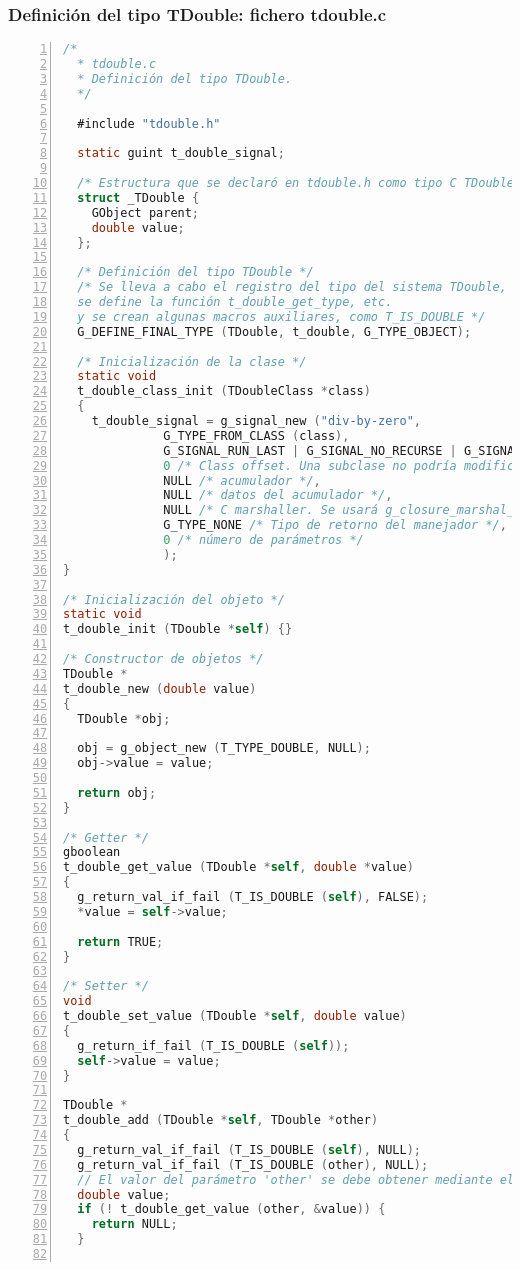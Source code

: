 \subsubsection{Definición del tipo \textsf{TDouble}: fichero \textsf{tdouble.c}}
\begin{lstlisting}[language=C, numbers=left]
  /*
  * tdouble.c
  * Definición del tipo TDouble.
  */

  #include "tdouble.h"

  static guint t_double_signal;

  /* Estructura que se declaró en tdouble.h como tipo C TDouble */
  struct _TDouble {
    GObject parent;
    double value;
  };

  /* Definición del tipo TDouble */
  /* Se lleva a cabo el registro del tipo del sistema TDouble,
  se define la función t_double_get_type, etc.
  y se crean algunas macros auxiliares, como T_IS_DOUBLE */
  G_DEFINE_FINAL_TYPE (TDouble, t_double, G_TYPE_OBJECT);

  /* Inicialización de la clase */
  static void
  t_double_class_init (TDoubleClass *class)
  {
    t_double_signal = g_signal_new ("div-by-zero",
			  G_TYPE_FROM_CLASS (class),
			  G_SIGNAL_RUN_LAST | G_SIGNAL_NO_RECURSE | G_SIGNAL_NO_HOOKS,
			  0 /* Class offset. Una subclase no podría modificar el manejador de señal (manejador por defecto) */,
			  NULL /* acumulador */,
			  NULL /* datos del acumulador */,
			  NULL /* C marshaller. Se usará g_closure_marshal_generic() */,
			  G_TYPE_NONE /* Tipo de retorno del manejador */,
			  0 /* número de parámetros */
			  );
}

/* Inicialización del objeto */
static void
t_double_init (TDouble *self) {}

/* Constructor de objetos */
TDouble *
t_double_new (double value)
{
  TDouble *obj;
  
  obj = g_object_new (T_TYPE_DOUBLE, NULL);
  obj->value = value;
  
  return obj;
}

/* Getter */
gboolean
t_double_get_value (TDouble *self, double *value)
{
  g_return_val_if_fail (T_IS_DOUBLE (self), FALSE);
  *value = self->value;
  
  return TRUE;
}

/* Setter */
void
t_double_set_value (TDouble *self, double value)
{
  g_return_if_fail (T_IS_DOUBLE (self));
  self->value = value;
}

TDouble *
t_double_add (TDouble *self, TDouble *other)
{
  g_return_val_if_fail (T_IS_DOUBLE (self), NULL);
  g_return_val_if_fail (T_IS_DOUBLE (other), NULL);
  // El valor del parámetro 'other' se debe obtener mediante el método 'getter'
  double value;
  if (! t_double_get_value (other, &value)) {
    return NULL;
  }
    

\end{lstlisting}
